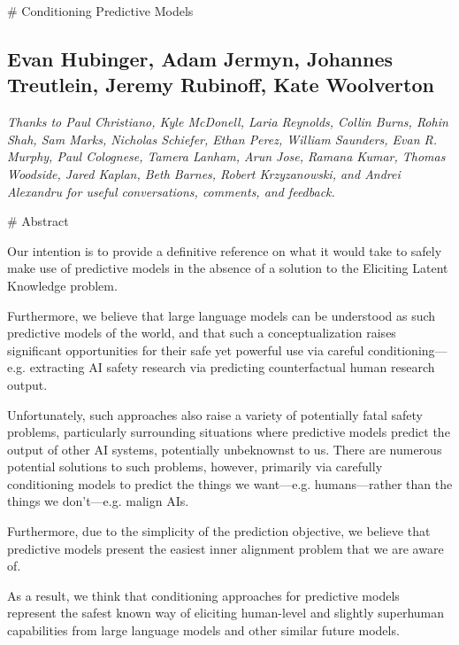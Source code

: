 # Conditioning Predictive Models

\subsection{Evan Hubinger, Adam Jermyn, Johannes Treutlein, Jeremy Rubinoff, Kate Woolverton}



\textit{Thanks to Paul Christiano, Kyle McDonell, Laria Reynolds, Collin Burns, Rohin Shah, Sam Marks, Nicholas Schiefer, Ethan Perez, William Saunders, Evan R. Murphy, Paul Colognese, Tamera Lanham, Arun Jose, Ramana Kumar, Thomas Woodside, Jared Kaplan, Beth Barnes, Robert Krzyzanowski, and Andrei Alexandru for useful conversations, comments, and feedback.}


# Abstract

Our intention is to provide a definitive reference on what it would take to safely make use of predictive models in the absence of a solution to the Eliciting Latent Knowledge\cite{TODO: cite https://www.alignmentforum.org/posts/qHCDysDnvhteW7kRd/arc-s-first-technical-report-eliciting-latent-knowledge} problem.

Furthermore, we believe that large language models can be understood as such predictive models of the world, and that such a conceptualization raises significant opportunities for their safe yet powerful use via careful conditioning---e.g. extracting AI safety research via predicting counterfactual human research output.

Unfortunately, such approaches also raise a variety of potentially fatal safety problems, particularly surrounding situations where predictive models predict the output of other AI systems, potentially unbeknownst to us. There are numerous potential solutions to such problems, however, primarily via carefully conditioning models to predict the things we want---e.g. humans---rather than the things we don't---e.g. malign AIs.

Furthermore, due to the simplicity of the prediction objective, we believe that predictive models present the easiest inner alignment problem that we are aware of.

As a result, we think that conditioning approaches for predictive models represent the safest known way of eliciting human-level and slightly superhuman capabilities from large language models and other similar future models.




